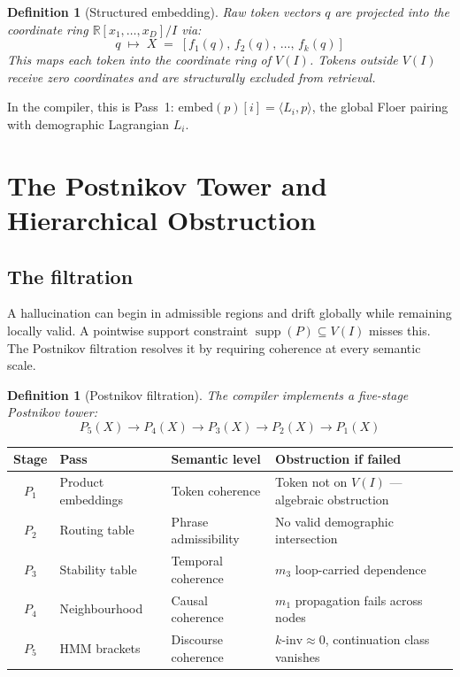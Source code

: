 \documentclass[11pt,a4paper]{article}
\newtheorem{definition}[theorem]{Definition}
\DeclareMathOperator{\supp}{supp}
\begin{document}
\begin{definition}[Structured embedding]
Raw token vectors $q$ are projected into the coordinate ring
$\mathbb{R}[x_1,\ldots,x_D]/I$ via:
\[
  q \;\mapsto\; X \;=\; [f_1(q),\, f_2(q),\, \ldots,\, f_k(q)]
\]
This maps each token into the coordinate ring of $V(I)$.
Tokens outside $V(I)$ receive zero coordinates and are
structurally excluded from retrieval.
\end{definition}

In the compiler, this is Pass~1:
$\mathrm{embed}(p)[i] = \langle L_i, p\rangle$, the global
Floer pairing with demographic Lagrangian $L_i$.

\section{The Postnikov Tower and Hierarchical Obstruction}

\subsection{The filtration}

A hallucination can begin in admissible regions and drift globally
while remaining locally valid. A pointwise support constraint
$\supp(P) \subseteq V(I)$ misses this. The Postnikov filtration
resolves it by requiring coherence at every semantic scale.

\begin{definition}[Postnikov filtration]
The compiler implements a five-stage Postnikov tower:
\[
  P_5(X) \to P_4(X) \to P_3(X) \to P_2(X) \to P_1(X)
\]
\end{definition}

\begin{center}
\renewcommand{\arraystretch}{1.3}
\begin{tabular}{cllp{4cm}}
\toprule
Stage & Pass & Semantic level & Obstruction if failed \\
\midrule
$P_1$ & Product embeddings & Token coherence &
  Token not on $V(I)$ --- algebraic obstruction \\
$P_2$ & Routing table & Phrase admissibility &
  No valid demographic intersection \\
$P_3$ & Stability table & Temporal coherence &
  $m_3$ loop-carried dependence \\
$P_4$ & Neighbourhood & Causal coherence &
  $m_1$ propagation fails across nodes \\
$P_5$ & HMM brackets & Discourse coherence &
  $k\text{-inv} \approx 0$, continuation class vanishes \\
\bottomrule
\end{tabular}
\end{center}
\end{document}
